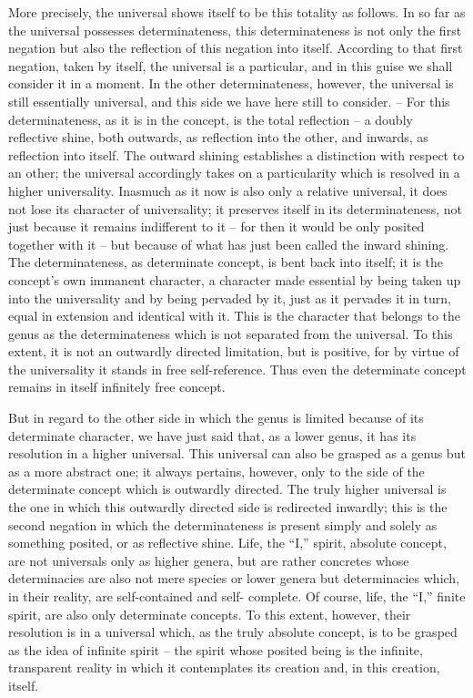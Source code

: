 More precisely, the universal shows itself to be this totality as follows.
In so far as the universal possesses determinateness, this determinateness
is not only the first negation but also the reflection of this negation into
itself. According to that first negation, taken by itself, the universal is a
particular, and in this guise we shall consider it in a moment. In the other
determinateness, however, the universal is still essentially universal, and
this side we have here still to consider. – For this determinateness, as it
is in the concept, is the total reflection – a doubly reflective shine, both
outwards, as reflection into the other, and inwards, as reflection into itself.
The outward shining establishes a distinction with respect to an other; the
universal accordingly takes on a particularity which is resolved in a higher
universality. Inasmuch as it now is also only a relative universal, it does not
lose its character of universality; it preserves itself in its determinateness,
not just because it remains indifferent to it – for then it would be only
posited together with it – but because of what has just been called the inward
shining. The determinateness, as determinate concept, is bent back into itself;
it is the concept's own immanent character, a character made essential by
being taken up into the universality and by being pervaded by it, just as
it pervades it in turn, equal in extension and identical with it. This is
the character that belongs to the genus as the determinateness which is
not separated from the universal. To this extent, it is not an outwardly
directed limitation, but is positive, for by virtue of the universality it stands
in free self-reference. Thus even the determinate concept remains in itself
infinitely free concept.

But in regard to the other side in which the genus is limited because of
its determinate character, we have just said that, as a lower genus, it has
its resolution in a higher universal. This universal can also be grasped as
a genus but as a more abstract one; it always pertains, however, only to
the side of the determinate concept which is outwardly directed. The truly
higher universal is the one in which this outwardly directed side is redirected
inwardly; this is the second negation in which the determinateness is present
simply and solely as something posited, or as reflective shine. Life, the “I,”
spirit, absolute concept, are not universals only as higher genera, but are
rather concretes whose determinacies are also not mere species or lower
genera but determinacies which, in their reality, are self-contained and self-
complete. Of course, life, the “I,” finite spirit, are also only determinate
concepts. To this extent, however, their resolution is in a universal which,
as the truly absolute concept, is to be grasped as the idea of infinite spirit –
the spirit whose posited being is the infinite, transparent reality in which it
contemplates its creation and, in this creation, itself.

